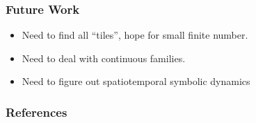 \documentclass[mathserif, handout]{beamer}
\begin{document}
\begin{frame}[allowframebreaks]
  \frametitle{Future Work}
  \begin{itemize}
  \item Need to find all ``tiles'', hope for small finite number.
  \item Need to deal with continuous families.
  \item Need to figure out spatiotemporal symbolic dynamics
  \end{itemize}

\end{frame}


\begin{frame}[allowframebreaks]
  \frametitle{References}
  \scriptsize{}
  
\end{frame}

\begin{frame}

  \vspace{2em}

\end{frame}
\end{document}
